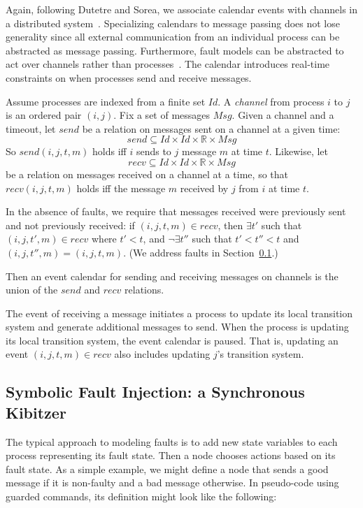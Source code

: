 \documentclass{llncs/llncs}
\newcommand{\Id}{\ensuremath{\mathit{Id}}\xspace}
\newcommand{\Msg}{\ensuremath{\mathit{Msg}}\xspace}
\begin{document}
Again, following Dutetre and Sorea, we associate calendar events with channels in a distributed system~\cite{cal}. Specializing calendars to message passing does not lose generality since all external communication from an individual process can be abstracted as message passing. Furthermore, fault models can be abstracted to act over channels rather than processes~\cite{abstractions}. The calendar introduces real-time constraints on when processes send and receive messages.

Assume processes are indexed from a finite set $\Id$. A \emph{channel} from process $i$ to $j$ is an ordered pair $(i,j)$. Fix a set of messages $\Msg$. Given a channel and a timeout, let $send$ be a relation on messages sent on a channel at a given time:
$$send \subseteq \Id \times \Id \times \mathbb{R} \times \Msg$$
So $send(i, j, t, m)$ holds iff $i$ sends to $j$ message $m$ at time $t$. Likewise, let
$$recv \subseteq \Id \times \Id \times \mathbb{R} \times \Msg$$
be a relation on messages received on a channel at a time, so that $recv(i, j, t, m)$ holds iff the message $m$ received by $j$ from $i$ at time $t$.

In the absence of faults, we require that messages received were previously sent and not previously received: if $(i, j, t, m) \in recv$, then $\exists t'$ such that $(i, j, t', m) \in recv$ where $t' < t$, and $\neg\exists t''$ such that $t' < t'' < t$ and $(i, j, t'', m) = (i, j, t, m)$. (We address faults in Section~\ref{sec:kibitzer}.)

Then an event calendar for sending and receiving messages on channels is the union of the $send$ and $recv$ relations.

The event of receiving a message initiates a process to update its local transition system and generate additional messages to send. When the process is updating its local transition system, the event calendar is paused. That is, updating an event $(i, j, t, m) \in recv$ also includes updating $j$'s transition system.

\subsection{Symbolic Fault Injection: a Synchronous Kibitzer}\label{sec:kibitzer}
The typical approach to modeling faults is to add new state variables to each process representing its fault state. Then a node chooses actions based on its fault state. As a simple example, we might define a node that sends a good message if it is non-faulty and a bad message otherwise. In pseudo-code using guarded commands, its definition might look like the following:
\end{document}
